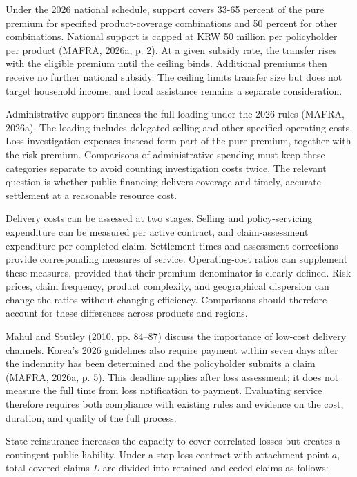 Under the 2026 national schedule, support covers 33-65 percent of the pure premium for specified product-coverage combinations and 50 percent for other combinations. National support is capped at KRW 50 million per policyholder per product (MAFRA, 2026a, p. 2). At a given subsidy rate, the transfer rises with the eligible premium until the ceiling binds. Additional premiums then receive no further national subsidy. The ceiling limits transfer size but does not target household income, and local assistance remains a separate consideration.


Administrative support finances the full loading under the 2026 rules (MAFRA, 2026a). The loading includes delegated selling and other specified operating costs. Loss-investigation expenses instead form part of the pure premium, together with the risk premium. Comparisons of administrative spending must keep these categories separate to avoid counting investigation costs twice. The relevant question is whether public financing delivers coverage and timely, accurate settlement at a reasonable resource cost.

Delivery costs can be assessed at two stages. Selling and policy-servicing expenditure can be measured per active contract, and claim-assessment expenditure per completed claim. Settlement times and assessment corrections provide corresponding measures of service. Operating-cost ratios can supplement these measures, provided that their premium denominator is clearly defined. Risk prices, claim frequency, product complexity, and geographical dispersion can change the ratios without changing efficiency. Comparisons should therefore account for these differences across products and regions.

Mahul and Stutley (2010, pp. 84--87) discuss the importance of low-cost delivery channels. Korea's 2026 guidelines also require payment within seven days after the indemnity has been determined and the policyholder submits a claim (MAFRA, 2026a, p. 5). This deadline applies after loss assessment; it does not measure the full time from loss notification to payment. Evaluating service therefore requires both compliance with existing rules and evidence on the cost, duration, and quality of the full process.


State reinsurance increases the capacity to cover correlated losses but creates a contingent public liability. Under a stop-loss contract with attachment point \(a\), total covered claims \(L\) are divided into retained and ceded claims as follows:

